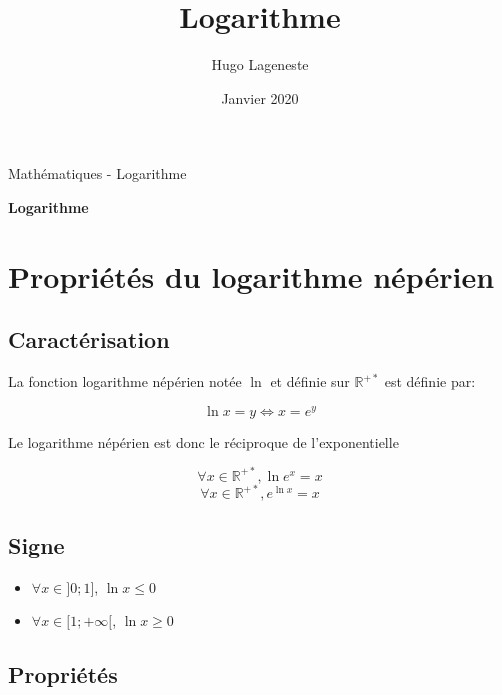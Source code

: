\documentclass[a4paper]{article}
\title{Logarithme}
\author{Hugo Lageneste}
\date{Janvier 2020}
\begin{document}
{Mathématiques - Logarithme}

\begin{center}
 \newcommand{\HRule}{\rule{\linewidth}{0.5mm}}
 {\huge \bfseries Logarithme}\\[0.1cm]
\end{center}

\section{Propriétés du logarithme népérien}
\subsection{Caractérisation}

{La fonction logarithme népérien notée $\ln{}$ et définie sur $\mathbb{R}^{+*}$ est définie par:}

\[\ln{x}=y \Leftrightarrow x=e^y\]

{Le logarithme népérien est donc le réciproque de l'exponentielle}

\[\forall x \in \mathbb{R}^{+*}, \ln{e^x}=x\]
\[\forall x \in \mathbb{R}^{+*}, e^{\ln{x}}=x\]

\subsection{Signe}

\begin{multicols}{2}
	\begin{itemize}
  		\item{$\forall x \in ]0;1]$, $\ln{x} \leqslant 0$}
  		\item{$\forall x \in [1;+\infty[$, $\ln{x} \geqslant 0$}
	\end{itemize}
\end{multicols}

\begin{center}
\end{center}

\subsection{Propriétés}
\end{document}
